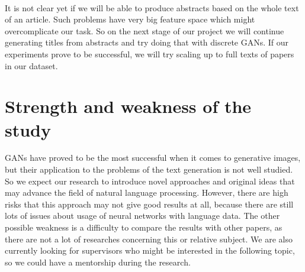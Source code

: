 \documentclass[sigplan]{acmart}
\begin{document}
\paragraph{} It is not clear yet if we will be able to produce abstracts based on the whole text of an article. Such problems have very big feature space which might overcomplicate our task. So on the next stage of our project we will continue generating titles from abstracts and try doing that with discrete GANs. If our experiments prove to be successful, we will try scaling up to full texts of papers in our dataset.




\section{Strength and weakness of the study}
GANs have proved to be the most successful when it comes to generative images, but their application to the problems of the text generation is not well studied. So we expect our research to introduce novel approaches and original ideas that may advance the field of natural language processing.
However, there are high risks that this approach may not give good results at all, because there are still lots of issues about  usage of neural networks with language data. The other possible weakness is a difficulty to compare the results with other papers, as there are not a lot of researches concerning this or relative subject. 
We are also currently looking for supervisors who might be interested in the following topic, so we could have a mentorship during the research.
\end{document}
